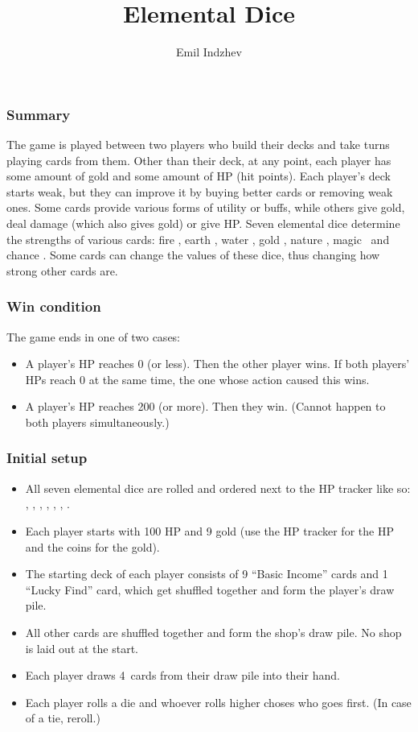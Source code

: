 \documentclass[dvipsnames,parskip,a4paper]{scrartcl}
\title{Elemental Dice}
\author{Emil Indzhev}
\newcommand{\iconsize}{3.4mm}
\newcommand{\icondepth}{0.45mm}
\newcommand{\icon}[1]{\raisebox{-\icondepth}{\texttt{[image:  \#1 ]}}}
\newcommand{\fire}{\icon{icons/fire.png}}
\newcommand{\earth}{\icon{icons/earth.png}}
\newcommand{\water}{\icon{icons/water.png}}
\newcommand{\nature}{\icon{icons/nature.png}}
\newcommand{\magic}{\icon{icons/magic.png}}
\newcommand{\gold}{\icon{icons/gold.png}}
\newcommand{\chance}{\icon{icons/chance.png}}
\newcommand{\handsize}{4}
\begin{document}
\maketitle

\subsubsection*{Summary}

The game is played between two players who build their decks and take turns playing cards from them. Other than their deck, at any point, each player has some amount of gold and some amount of HP (hit points). Each player's deck starts weak, but they can improve it by buying better cards or removing weak ones. Some cards provide various forms of utility or buffs, while others give gold, deal damage (which also gives gold) or give HP. Seven elemental dice determine the strengths of various cards: fire \fire, earth \earth, water \water, gold \gold, nature \nature, magic \magic \ and chance \chance. Some cards can change the values of these dice, thus changing how strong other cards are.

\subsubsection*{Win condition}

The game ends in one of two cases:

\begin{itemize}
\item A player's HP reaches 0 (or less). Then the other player wins. If both players' HPs reach 0 at the same time, the one whose action caused this wins.
\item A player's HP reaches 200 (or more). Then they win. (Cannot happen to both players simultaneously.)
\end{itemize}

\subsubsection*{Initial setup}

\begin{itemize}
\item All seven elemental dice are rolled and ordered next to the HP tracker like so: \fire, \earth, \water, \gold, \nature, \magic, \chance.
\item Each player starts with 100 HP and 9 gold (use the HP tracker for the HP and the coins for the gold).
\item The starting deck of each player consists of 9 ``Basic Income'' cards and 1 ``Lucky Find'' card, which get shuffled together and form the player's draw pile.
\item All other cards are shuffled together and form the shop's draw pile. No shop is laid out at the start.
\item Each player draws \handsize \ cards from their draw pile into their hand.
\item Each player rolls a die and whoever rolls higher choses who goes first. (In case of a tie, reroll.)
\end{itemize}
\end{document}
